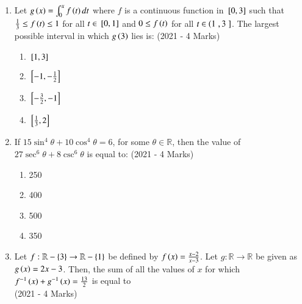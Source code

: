 \documentclass[journal]{IEEEtran}
\begin{document}
\begin{enumerate}
{        }
    \item{
     
            Let $g\left(x\right) = \int_{0}^{x} f\left(t\right) dt$ where $f$ is a continuous function in ${}\left[0, 3\right]$ such that $\frac{1}{3} \leq f\left(t\right) \leq 1$ for all $t \in {}\left[0, 1\right]$ and $0 \leq f\left(t\right)$ for all $t \in \left(1\right., 3{}\left.\right]$. The largest possible interval in which $g\left(3\right)$ lies is:\hfill
                {(2021 - 4 Marks)}
            \begin{multicols}{4}
                \begin{enumerate}
                    \item ${}\left[1, 3\right]$
                    
                    \item ${}\left[-1, -\frac{1}{2}\right]$
                    
                    \item ${}\left[-\frac{3}{2}, -1\right]$
                    
                    \item ${}\left[\frac{1}{3}, 2\right]$
                \end{enumerate}
            \end{multicols}
        
        }
    \item{
            If $15 \sin^4 \theta + 10 \cos^4 \theta = 6$, for some $\theta \in \mathbb{R}$, then the value of $27 \sec^6 \theta + 8 \csc^6 \theta$ is equal to:
           	\hfill
                {(2021 - 4 Marks)}
            
            \begin{multicols}{4}
				\begin{enumerate}
					\item 250
					\item 400
					\item 500
					\item 350
				\end{enumerate}
			\end{multicols}
        
        }
 	\item{
        	Let $f: \mathbb{R} - \left\{3\right\} \rightarrow \mathbb{R} - \left\{1\right\}$ be defined by $f\left(x\right) = \frac{x - 2}{x - 3}$. Let $g: \mathbb{R} \rightarrow \mathbb{R}$ be given as $g\left(x\right) = 2x - 3$. Then, the sum of all the values of $x$ for which $f^{-1}\left(x\right)+ g^{-1}\left(x\right) = \frac{13}{2}$ is equal to\\ \text{ }
        	\hfill
        	{(2021 - 4 Marks)}
        	
}
\end{enumerate}
\end{document}

